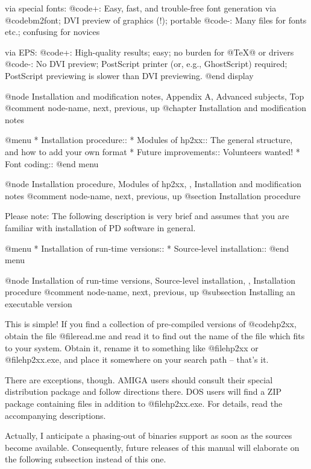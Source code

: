 via special fonts:
  @code{+:} Easy, fast, and trouble-free font generation via @code{bm2font};
            DVI preview of graphics (!); portable
  @code{-:} Many files for fonts etc.; confusing for novices

via EPS:
  @code{+:} High-quality results; easy; no burden for @TeX{}@ or drivers
  @code{-:} No DVI preview; PostScript printer (or, e.g., GhostScript) required;
            PostScript previewing is slower than DVI previewing.
@end display




@node Installation and modification notes, Appendix A, Advanced subjects, Top
@comment  node-name,  next,  previous,  up
@chapter Installation and modification notes

@menu
* Installation procedure::
* Modules of hp2xx::       The general structure, and how to add your own format
* Future improvements::    Volunteers wanted!
* Font coding::
@end menu

@node Installation procedure, Modules of hp2xx, , Installation and modification notes
@comment  node-name,  next,  previous,  up
@section Installation procedure

Please note: The following description is very brief and assumes that you
are familiar with installation of PD software in general.

@menu
* Installation of run-time versions::
* Source-level installation::
@end menu

@node Installation of run-time versions, Source-level installation, , Installation procedure
@comment  node-name,  next,  previous,  up
@subsection Installing an executable version

This is simple! If you find a collection of pre-compiled versions of
@code{hp2xx}, obtain the file @file{read.me} and read it to find out the
name of the file which fits to your system. Obtain it, rename it to something
like @file{hp2xx} or @file{hp2xx.exe}, and place it somewhere on your
search path -- that's it.

There are exceptions, though. AMIGA users should consult their special
distribution package and follow directions there. DOS users will find a
ZIP package containing files in addition to @file{hp2xx.exe}. For details,
read the accompanying descriptions.

Actually, I anticipate a phasing-out of binaries support as soon as
the sources become available. Consequently, future releases of this
manual will elaborate on the following subsection instead of this one.



